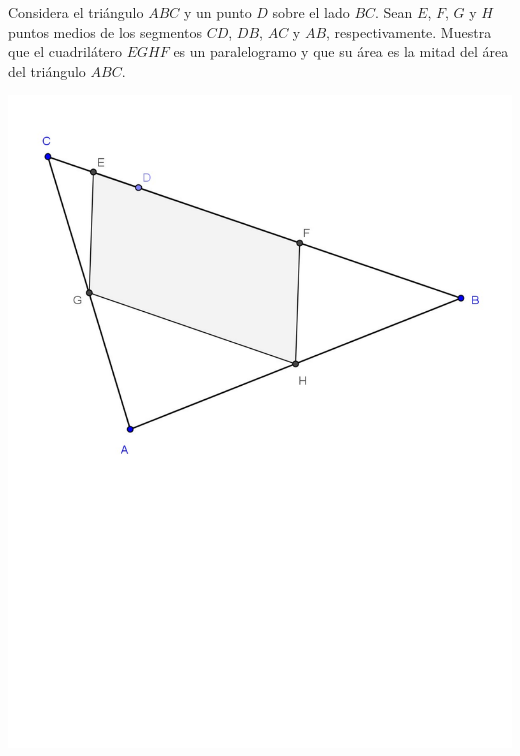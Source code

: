\begin{Solucion}
  
\end{Solucion}

\begin{Problema}{6}
  Considera el tri\'angulo $ABC$ y un punto $D$ sobre el lado
  $BC$. Sean $E$, $F$, $G$ y $H$ puntos medios de los segmentos $CD$,
  $DB$, $AC$ y $AB$, respectivamente. Muestra que el cuadril\'atero
  $EGHF$ es un paralelogramo y que su \'area es la mitad del \'area
  del tri\'angulo $ABC$.

  \begin{center}
    \includegraphics[scale=0.5,viewport=28 349 587 763]{Triangulo1.pdf}
  \end{center}
\end{Problema}

\begin{Solucion}
  
\end{Solucion}

